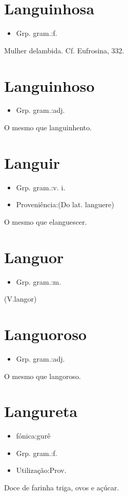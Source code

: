 \section{Languinhosa}
\begin{itemize}
\item {Grp. gram.:f.}
\end{itemize}
Mulher delambida. Cf. \textunderscore Eufrosina\textunderscore , 332.
\section{Languinhoso}
\begin{itemize}
\item {Grp. gram.:adj.}
\end{itemize}
O mesmo que \textunderscore languinhento\textunderscore .
\section{Languir}
\begin{itemize}
\item {Grp. gram.:v. i.}
\end{itemize}
\begin{itemize}
\item {Proveniência:(Do lat. \textunderscore languere\textunderscore )}
\end{itemize}
O mesmo que \textunderscore elanguescer\textunderscore .
\section{Languor}
\begin{itemize}
\item {Grp. gram.:m.}
\end{itemize}
(V.langor)
\section{Languoroso}
\begin{itemize}
\item {Grp. gram.:adj.}
\end{itemize}
O mesmo que \textunderscore langoroso\textunderscore .
\section{Langureta}
\begin{itemize}
\item {fónica:gurê}
\end{itemize}
\begin{itemize}
\item {Grp. gram.:f.}
\end{itemize}
\begin{itemize}
\item {Utilização:Prov.}
\end{itemize}
Doce de farinha triga, ovos e açúcar.
